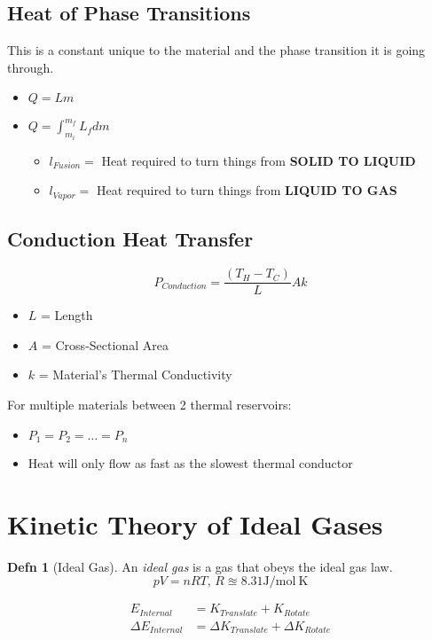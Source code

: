\documentclass[10pt,letterpaper,final,twoside,notitlepage]{article}
\numberwithin{equation}{section} %
\theoremstyle{definition}
\newtheorem{definition}{Defn} %
\theoremstyle{remark}
\begin{document}
	\subsection*{Heat of Phase Transitions} \label{subec:Heat Phase Transitions}
	This is a constant unique to the material and the phase transition it is going through.
	\begin{itemize}[nolistsep]
		\item $Q = Lm$
		\item $Q = \int_{m_{i}}^{m_{f}} L_{f} dm$
		\begin{itemize}[noitemsep, nolistsep]
			\item $l_{Fusion} = $ Heat required to turn things from \textbf{SOLID TO LIQUID}
			\item $l_{Vapor} = $ Heat required to turn things from \textbf{LIQUID TO GAS}
		\end{itemize}
	\end{itemize}

	\subsection*{Conduction Heat Transfer} \label{subsec:Conduction Heat Transfer}
	\begin{equation} \label{eq:Conduction Heat Transfer}
		P_{Conduction} = \frac{\left( T_{H} - T_{C} \right)}{L} Ak
	\end{equation}
		\begin{itemize}[noitemsep, nolistsep]
			\item $L$ = Length
			\item $A$ = Cross-Sectional Area
			\item $k$ = Material's Thermal Conductivity
		\end{itemize}
	For multiple materials between 2 thermal reservoirs:
	\begin{itemize}[noitemsep, nolistsep]
		\item $P_{1} = P_{2} = \ldots = P_{n}$
		\item Heat will only flow as fast as the slowest thermal conductor
	\end{itemize}

\section{Kinetic Theory of Ideal Gases} \label{sec:Kinetic Theory of Ideal Gases}
	\begin{definition}[Ideal Gas] \label{def:Ideal Gas}
		An \emph{ideal gas} is a gas that obeys the ideal gas law.
		\begin{equation} \label{eq:Ideal Gas Law}
			pV = nRT \text{, } R \approxeq 8.31 \si{\joule / \mole~\kelvin}
		\end{equation}
	\end{definition}
	\begin{align} \label{eq:Total Internal Energy of Ideal Gas}
		E_{Internal} &= K_{Translate} + K_{Rotate} \\
		\Delta E_{Internal} &= \Delta K_{Translate} + \Delta K_{Rotate} 
	\end{align}
\end{document}
